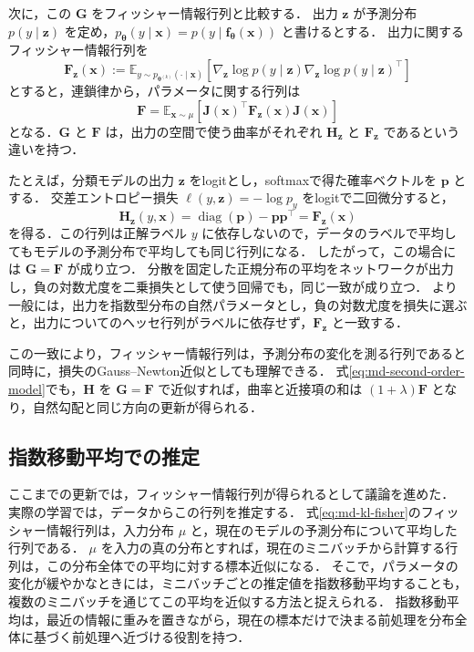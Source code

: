 \documentclass[../main.tex]{subfiles}
\begin{document}
次に，この $\bm{G}$ をフィッシャー情報行列と比較する．
出力 $\bm{z}$ が予測分布 $p(y\mid\bm{z})$ を定め，$p_{\bm{\theta}}(y\mid\bm{x})=p(y\mid\bm{f}_{\bm{\theta}}(\bm{x}))$ と書けるとする．
出力に関するフィッシャー情報行列を
\begin{equation}
  \bm{F}_{\bm{z}}(\bm{x})
  :=\mathbb{E}_{y\sim p_{\bm{\theta}^{(k)}}(\cdot\mid\bm{x})}
  \left[\nabla_{\bm{z}}\log p(y\mid\bm{z})
  \nabla_{\bm{z}}\log p(y\mid\bm{z})^\top\right]
  \label{eq:md-output-fisher}
\end{equation}
とすると，連鎖律から，パラメータに関する行列は
\begin{equation}
  \bm{F}=\mathbb{E}_{\bm{x}\sim\mu}
  [\bm{J}(\bm{x})^\top\bm{F}_{\bm{z}}(\bm{x})\bm{J}(\bm{x})]
  \label{eq:md-fisher-pullback}
\end{equation}
となる．$\bm{G}$ と $\bm{F}$ は，出力の空間で使う曲率がそれぞれ $\bm{H}_{\bm{z}}$ と $\bm{F}_{\bm{z}}$ であるという違いを持つ．

たとえば，分類モデルの出力 $\bm{z}$ をlogitとし，softmaxで得た確率ベクトルを $\bm{p}$ とする．
交差エントロピー損失 $\ell(y,\bm{z})=-\log p_y$ をlogitで二回微分すると，
\begin{equation}
  \bm{H}_{\bm{z}}(y,\bm{x})
  =\operatorname{diag}(\bm{p})-\bm{p}\bm{p}^\top
  =\bm{F}_{\bm{z}}(\bm{x})
  \label{eq:md-softmax-fisher-gn}
\end{equation}
を得る．この行列は正解ラベル $y$ に依存しないので，データのラベルで平均してもモデルの予測分布で平均しても同じ行列になる．
したがって，この場合には $\bm{G}=\bm{F}$ が成り立つ．
分散を固定した正規分布の平均をネットワークが出力し，負の対数尤度を二乗損失として使う回帰でも，同じ一致が成り立つ．
より一般には，出力を指数型分布の自然パラメータとし，負の対数尤度を損失に選ぶと，出力についてのヘッセ行列がラベルに依存せず，$\bm{F}_{\bm{z}}$ と一致する\cite{grosse2021metrics}．

この一致により，フィッシャー情報行列は，予測分布の変化を測る行列であると同時に，損失のGauss--Newton近似としても理解できる．
式\eqref{eq:md-second-order-model}でも，$\bm{H}$ を $\bm{G}=\bm{F}$ で近似すれば，曲率と近接項の和は $(1+\lambda)\bm{F}$ となり，自然勾配と同じ方向の更新が得られる．

\subsection{指数移動平均での推定}
\label{subsec:md-ema-estimation}

ここまでの更新では，フィッシャー情報行列が得られるとして議論を進めた．
実際の学習では，データからこの行列を推定する．
式\eqref{eq:md-kl-fisher}のフィッシャー情報行列は，入力分布 $\mu$ と，現在のモデルの予測分布について平均した行列である．
$\mu$ を入力の真の分布とすれば，現在のミニバッチから計算する行列は，この分布全体での平均に対する標本近似になる．
そこで，パラメータの変化が緩やかなときには，ミニバッチごとの推定値を指数移動平均することも，複数のミニバッチを通じてこの平均を近似する方法と捉えられる\cite{martens2020natural,urettini2025ocar}．
指数移動平均は，最近の情報に重みを置きながら，現在の標本だけで決まる前処理を分布全体に基づく前処理へ近づける役割を持つ．
\end{document}
